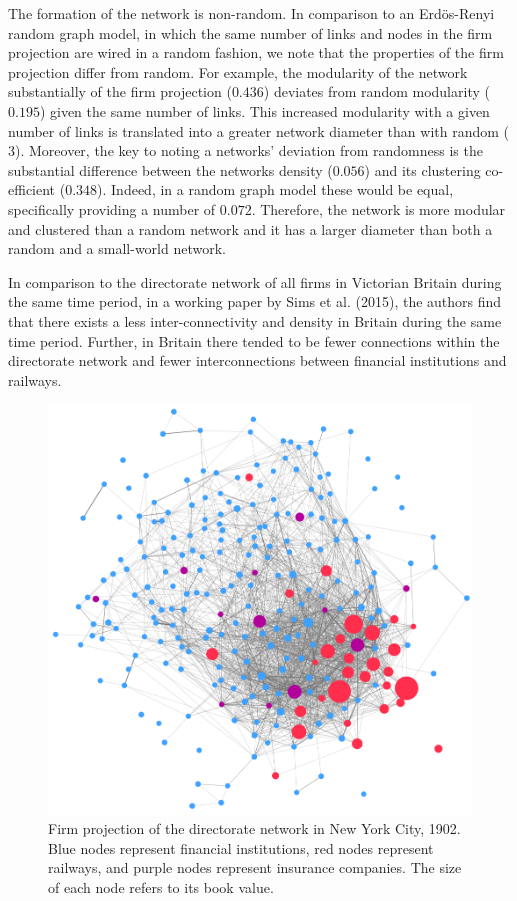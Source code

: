 The formation of the network is non-random. In comparison to an Erd\"{o}s-Renyi random graph model, in which the same number of links and nodes in the firm projection are wired in a random fashion, we note that the properties of the firm projection differ from random. For example, the modularity of the network substantially of the firm projection ($0.436$) deviates from random modularity ($0.195$) given the same number of links. This increased modularity with a given number of links is translated into a greater network diameter than with random ($3$). Moreover, the key to noting a networks' deviation from randomness is the substantial difference between the networks density ($0.056$) and its clustering co-efficient ($0.348$). Indeed, in a random graph model these would be equal, specifically providing a number of $0.072$. Therefore, the network is more modular and clustered than a random network and it has a larger diameter than both a random and a small-world network.

In comparison to the directorate network of all firms in Victorian Britain during the same time period, in a working paper by Sims et al. (2015), the authors find that there exists a less inter-connectivity and density in Britain during the same time period. Further, in Britain there tended to be fewer connections within the directorate network and fewer interconnections between financial institutions and railways.

\begin{figure}[t]
\begin{center}
\includegraphics[scale=0.38]{imgs/Institutions.png}
\end{center}
\caption[Firm projection of the directorate network in New York City, 1902]{Firm projection of the directorate network in New York City, 1902. Blue nodes represent financial institutions, red nodes represent railways, and purple nodes represent insurance companies. The size of each node refers to its book value.}
\label{1902firms}
\end{figure}

